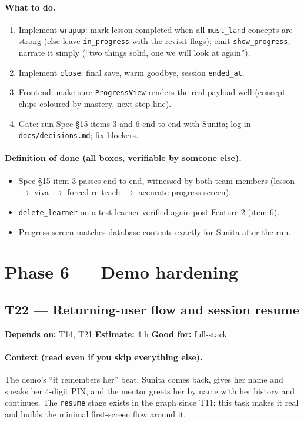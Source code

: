 \documentclass[11pt]{article}
\newcommand{\code}[1]{\texttt{#1}}
\newcommand{\taskmeta}[3]{\noindent\textbf{Depends on:} #1 \quad\textbullet\quad \textbf{Estimate:} #2 \quad\textbullet\quad \textbf{Good for:} #3\par\vspace{2pt}}
\newcommand{\ctx}[1]{\paragraph{Context (read even if you skip everything else).} #1}
\newcommand{\dod}{\paragraph{Definition of done (all boxes, verifiable by someone else).}}
\begin{document}
\paragraph{What to do.}
\begin{enumerate}
  \item Implement \code{wrapup}: mark lesson completed when all \code{must\_land} concepts are strong (else leave \code{in\_progress} with the revisit flags); emit \code{show\_progress}; narrate it simply (``two things solid, one we will look at again'').
  \item Implement \code{close}: final save, warm goodbye, session \code{ended\_at}.
  \item Frontend: make sure \code{ProgressView} renders the real payload well (concept chips coloured by mastery, next-step line).
  \item Gate: run Spec \S15 items 3 and 6 end to end with Sunita; log in \code{docs/decisions.md}; fix blockers.
\end{enumerate}
\dod
\begin{itemize}
  \item Spec \S15 item 3 passes end to end, witnessed by both team members (lesson \(\rightarrow\) viva \(\rightarrow\) forced re-teach \(\rightarrow\) accurate progress screen).
  \item \code{delete\_learner} on a test learner verified again post-Feature-2 (item 6).
  \item Progress screen matches database contents exactly for Sunita after the run.
\end{itemize}

\section{Phase 6 --- Demo hardening}

\subsection{T22 --- Returning-user flow and session resume \dag}
\taskmeta{T14, T21}{4 h}{full-stack}
\ctx{The demo's ``it remembers her'' beat: Sunita comes back, gives her name and speaks her 4-digit PIN, and the mentor greets her by name with her history and continues. The \code{resume} stage exists in the graph since T11; this task makes it real and builds the minimal first-screen flow around it.}
\end{document}
